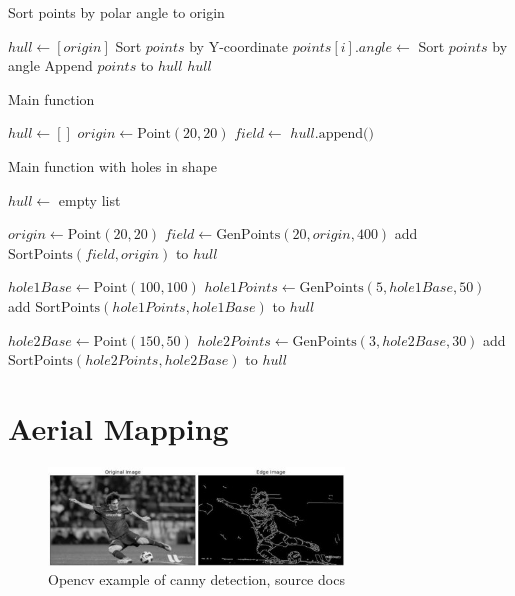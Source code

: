 \documentclass[final]{cmpreport_02}
\begin{document}
\begin{algorithm}[h!]
	\caption{Sort points by polar angle to origin}
	\label{mg:sortPoints}
	\begin{algorithmic}[1]
		\State $hull \gets [origin]$
		\State Sort $points$ by Y-coordinate
		\State $points[i].angle \gets$ 
		\EndFor
		\State Sort $points$ by angle
		\State Append $points$ to $hull$
		\State \Return $hull$
		\EndFunction
	\end{algorithmic}
\end{algorithm}

\begin{algorithm}[h!]
	\caption{Main function}
	\label{mg:main}
	\begin{algorithmic}[1]
		\State $hull \gets []$
		\State $origin \gets \text{Point}(20, 20)$
		\State $field \gets$ 
		\State $hull.\text{append}($$)$
		\EndFunction
	\end{algorithmic}
\end{algorithm}

\begin{algorithm}[h!]
	\caption{Main function with holes in shape}
	\label{mg:mainWithHoles}
	\begin{algorithmic}[1]
		\State $hull \gets$ empty list

		\State $origin \gets \text{Point}(20, 20)$
		\State $field \gets \text{GenPoints}(20, origin, 400)$
		\State add $\text{SortPoints}(field, origin)$ to $hull$

		\State $hole1Base \gets \text{Point}(100, 100)$
		\State $hole1Points \gets \text{GenPoints}(5, hole1Base, 50)$
		\State add $\text{SortPoints}(hole1Points, hole1Base)$ to $hull$

		\State $hole2Base \gets \text{Point}(150, 50)$
		\State $hole2Points \gets \text{GenPoints}(3, hole2Base, 30)$
		\State add $\text{SortPoints}(hole2Points, hole2Base)$ to $hull$
		\EndProcedure
	\end{algorithmic}
\end{algorithm}


\clearpage
\section{Aerial Mapping}

\begin{figure}[h!]
	\centering
	\includegraphics[width=0.7\textwidth]{./images/openCvCannyExample.jpg}
	\caption{Opencv example of canny detection, source \citep{opencv_library} docs}
	\label{am:cannyexample}
\end{figure}
\end{document}
